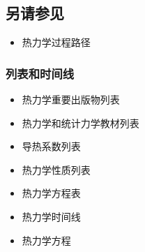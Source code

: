 \subsection{另请参见}
\begin{itemize}
\item 热力学过程路径
\end{itemize}
\subsubsection{列表和时间线}
\begin{itemize}
\item 热力学重要出版物列表
\item 热力学和统计力学教材列表
\item 导热系数列表
\item 热力学性质列表
\item 热力学方程表
\item 热力学时间线
\item 热力学方程
\end{itemize}